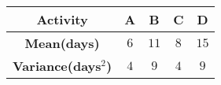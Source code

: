 \begin{tabular}[20pt]{ |c|c|c|c|c| }
    \hline
    \textbf{Activity} & \textbf{A} & \textbf{B} & \textbf{C} & \textbf{D} \\
    \hline
    \textbf{Mean(days)} & $6$ & $11$ & $8$ & $15$\\
    \hline 
    \textbf{Variance(days$^{2}$)} & $4$ & $9$ & $4$ & $9$\\
    \hline
\end{tabular}

